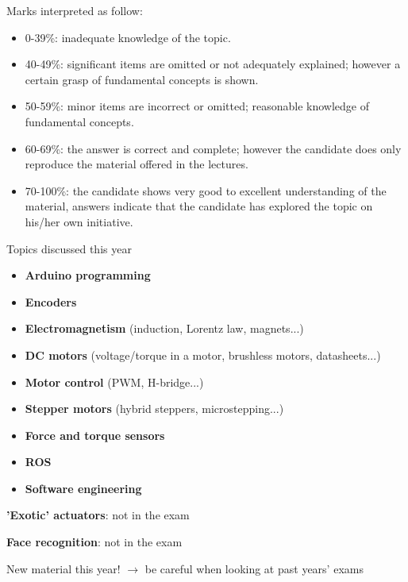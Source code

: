 \documentclass[compress]{beamer}
\begin{document}
\begin{frame}{}

    Marks interpreted as follow:

    \begin{itemize}
        \item 0-39\%:    inadequate knowledge of the topic.
        \item 40-49\%:    significant items are omitted or not adequately
            explained; however a certain grasp of fundamental concepts is shown.
        \item 50-59\%:   minor items are incorrect or omitted; reasonable
            knowledge of fundamental concepts.
        \item 60-69\%:   the answer is correct and complete; however the
            candidate does only reproduce the material offered in the lectures.
        \item 70-100\%:  the candidate shows very good to excellent understanding
            of the material, answers indicate that the candidate has explored
            the topic on his/her own initiative.
    \end{itemize}
\end{frame}

\begin{frame}{Topics discussed this year}
    \begin{itemize}
    \item \textbf{Arduino programming}
    \item \textbf{Encoders}
    \item \textbf{Electromagnetism} (induction, Lorentz law, magnets...)
    \item \textbf{DC motors} (voltage/torque in a motor, brushless motors, datasheets...)
    \item \textbf{Motor control} (PWM, H-bridge...)
    \item \textbf{Stepper motors} (hybrid steppers, microstepping...)
    \item \textbf{Force and torque sensors}
    \item \textbf{ROS}
    \item \textbf{Software engineering}
    \end{itemize}

    \pause

    \textbf{'Exotic' actuators}: not in the exam

    \textbf{Face recognition}: not in the exam

\end{frame}
\begin{frame}[plain]

    \begin{alertblock}{New material this year!}
        $\rightarrow$ be careful when looking at past years' exams
    \end{alertblock}

\end{frame}
\end{document}
